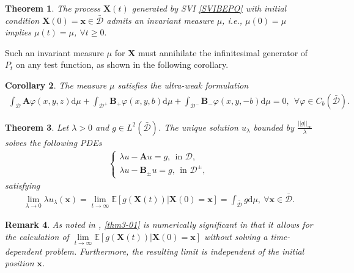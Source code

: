 \documentclass[12pt]{article}
\numberwithin{equation}{section}
\newtheorem{theorem}{Theorem}[section]
\newtheorem{corollary}[theorem]{Corollary}
\newtheorem{remark}[theorem]{Remark}
\def \E{\mathbb E}
\def \AA {\mathbf A}
\def \BB {\mathbf B}
\newcommand{\D}{\mathcal{D}}
\def\d{\mathrm{d}}
\begin{document}
\begin{theorem}\label{Thm-01}
	The process $\mathbf{X}(t)$ generated by SVI \eqref{SVIBEPO} 
	with initial condition $\mathbf{X}(0) = \mathbf{x}\in \bar{\mathcal{D}}$ 
	admits an invariant measure $\mu$, i.e., 
	$\mu(0) = \mu$ implies $\mu(t) = \mu$, $\forall t \geq 0.$  
\end{theorem}

Such an invariant measure $\mu$ for $\mathbf{X}$ 
must annihilate the infinitesimal generator of $P_{t}$ on any test function, 
as shown in the following corollary. 
\begin{corollary}\label{coro02}
	The measure $\mu$ satisfies the ultra-weak formulation
	\begin{align*}
		\int_{\mathcal{D}} \AA\varphi(x,y,z) \d \mu 
		+ \int_{\mathcal{D}^+} \BB_{+}\varphi(x,y,b) \d \mu
		+ \int_{\mathcal{D}^-} \BB_{-}\varphi(x,y,- b) \d \mu
		= 0,~~\forall \varphi\in C_{b}(\bar{\mathcal{D}}). 
	\end{align*}
\end{corollary}


\begin{theorem}\label{Thm-invariant-measure}
	Let $\lambda>0$ and $g\in L^{2}(\bar{\D})$. 
	The unique solution $u_{\lambda}$ bounded by 
	$\frac{||g||_\infty}{\lambda}$ solves the following PDEs
	\begin{align}\label{PDE-ulambda}
		\begin{cases}
			\lambda u - \AA u  = g,~~\text{in~}\mathcal{D}, \\
			\lambda u - \BB_\pm u = g,~~\text{in~}\mathcal{D}^\pm,
		\end{cases}
	\end{align}
	satisfying 
	\begin{align}
		\lim_{\lambda \to 0} \lambda u_\lambda(\mathbf{x})
		= \lim_{t\rightarrow \infty} \E[g(\mathbf{X}(t)) | \mathbf{X}(0) = \mathbf{x}]
		= \int_{\bar{\mathcal{D}}} g \d \mu, ~\forall \mathbf{x}\in\bar{\mathcal{D}}. \label{thm3-01}
	\end{align}
\end{theorem}
\begin{remark}
	As noted in \cite{BMPT09}, 
	\eqref{thm3-01} is numerically significant in that it allows for the calculation 
	of $\lim\limits_{t\rightarrow \infty} \E[g(\mathbf{X}(t)) | \mathbf{X}(0) = \mathbf{x}]$ without solving a time-dependent problem. 
	Furthermore, 
	the resulting limit is independent of the initial position $\mathbf{x}$.
\end{remark}
\end{document}
